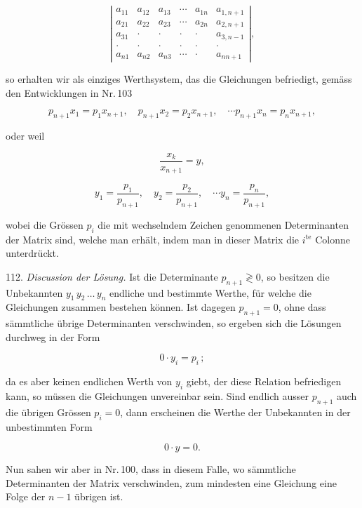 \documentclass[11pt]{article}
\providecommand{\weberpage}[1]{}
\begin{document}
\[ \left| \begin{array}{cccccc}
a_{11} & a_{12} & a_{13} & \cdots & a_{1n} & a_{1,n+1}\\
a_{21} & a_{22} & a_{23} & \cdots & a_{2n} & a_{2,n+1}\\
a_{31} & \cdot & \cdot & \cdot & \cdot & a_{3,n-1}\\ %
\cdot & \cdot & \cdot & \cdot & \cdot & \cdot\\
a_{n1} & a_{n2} & a_{n3} & \cdots & \cdot & a_{nn+1} %
\end{array} \right|,\]

so erhalten wir als einziges Werthsystem, das die Gleichungen befriedigt, gemäss den Entwicklungen in Nr.\,103

\[ p_{n+1}x_1=p_1x_{n+1},\quad p_{n+1}x_2=p_2x_{n+1},\quad \cdots p_{n+1}x_n=p_nx_{n+1}, \]


\weberpage{118}

oder weil

\[ \frac{x_k}{x_{n+1}} = y, \]

\[ y_1=\frac{p_1}{p_{n+1}},\quad y_2=\frac{p_2}{p_{n+1}},\quad \cdots y_n=\frac{p_n}{p_{n+1}}, \]

wobei die Grössen $p_i$ die mit wechselndem Zeichen genommenen Determinanten der Matrix sind, welche man erhält, indem man in dieser Matrix die $i^{\text{te}}$ Colonne unterdrückt.

112. \textit{Discussion der Lösung.} Ist die Determinante $p_{n+1}\gtrless 0$, so besitzen die Unbekannten $y_1\,y_2\,\ldots\,y_n$ endliche und bestimmte Werthe, für welche die Gleichungen zusammen bestehen können. Ist dagegen $p_{n+1}=0$, ohne dass sämmtliche übrige Determinanten verschwinden, so ergeben sich die Lösungen durchweg in der Form

\[ 0\cdot y_i = p_i\,; \]

da es aber keinen endlichen Werth von $y_i$ giebt, der diese Relation befriedigen kann, so müssen die Gleichungen unvereinbar sein. Sind endlich ausser $p_{n+1}$ auch die übrigen Grössen $p_i=0$, dann erscheinen die Werthe der Unbekannten in der unbestimmten Form

\[ 0\cdot y = 0. \]

Nun sahen wir aber in Nr.\,100, dass in diesem Falle, wo sämmtliche Determinanten der Matrix verschwinden, zum mindesten eine Gleichung eine Folge der $n-1$ übrigen ist.
\end{document}
